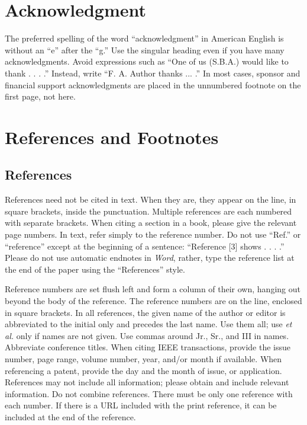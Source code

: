 \documentclass[journal]{IEEEtran}
\begin{document}
\section*{Acknowledgment}

The preferred spelling of the word ``acknowledgment'' in American English is without an ``e'' after the ``g.'' Use the singular heading even if you have many acknowledgments. Avoid expressions such as ``One of us (S.B.A.) would like to thank . . . .'' Instead, write “F. A. Author thanks ... .” In most cases, sponsor and financial support acknowledgments are placed in the unnumbered footnote on the first page, not here.

\section*{References and Footnotes}

\subsection{References}

References need not be cited in text. When they are, they appear on the line, in square brackets, inside the punctuation.  Multiple references are each numbered with separate brackets. When citing a section in a book, please give the relevant page numbers. In text, refer simply to the reference number. Do not use ``Ref.'' or ``reference'' except at the beginning of a sentence: ``Reference [3] shows . . . .'' Please do not use automatic endnotes in {\em Word}, rather, type the reference list at the end of the paper using the ``References'' style.

Reference numbers are set flush left and form a column of their own, hanging out beyond the body of the reference. The reference numbers are on the line, enclosed in square brackets. In all references, the given name of the author or editor is abbreviated to the initial only and precedes the last name. Use them all; use {\em et al.} only if names are not given. Use commas around Jr., Sr., and III in names. Abbreviate conference titles.  When citing IEEE transactions, provide the issue number, page range, volume number, year, and/or month if available. When referencing a patent, provide the day and the month of issue, or application. References may not include all information; please obtain and include relevant information. Do not combine references. There must be only one reference with each number. If there is a URL included with the print reference, it can be included at the end of the reference.
\end{document}
